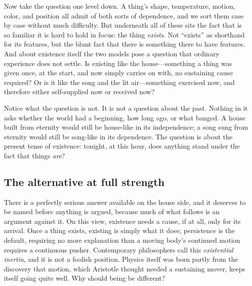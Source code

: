 Now take the question one level down. A thing's shape, temperature, motion, color, and position all admit of both sorts of dependence, and we sort them case by case without much difficulty. But underneath all of these sits the fact that is so familiar it is hard to hold in focus: the thing \emph{exists}. Not ``exists'' as shorthand for its features, but the blunt fact that there is something there to have features. And about existence itself the two models pose a question that ordinary experience does not settle. Is existing like the house---something a thing was given once, at the start, and now simply carries on with, no sustaining cause required? Or is it like the song and the lit air---something exercised now, and therefore either self-supplied now or received now?

Notice what the question is not. It is not a question about the past. Nothing in it asks whether the world had a beginning, how long ago, or what banged. A house built from eternity would still be house-like in its independence; a song sung from eternity would still be song-like in its dependence. The question is about the present tense of existence: tonight, at this hour, does anything stand under the fact that things \emph{are}?

\subsection{The alternative at full strength}

There is a perfectly serious answer available on the house side, and it deserves to be named before anything is argued, because much of what follows is an argument against it. On this view, existence needs a cause, if at all, only for its arrival. Once a thing exists, existing is simply what it does; persistence is the default, requiring no more explanation than a moving body's continued motion requires a continuous pusher. Contemporary philosophers call this \emph{existential inertia}, and it is not a foolish position. Physics itself was born partly from the discovery that motion, which Aristotle thought needed a sustaining mover, keeps itself going quite well. Why should being be different?

